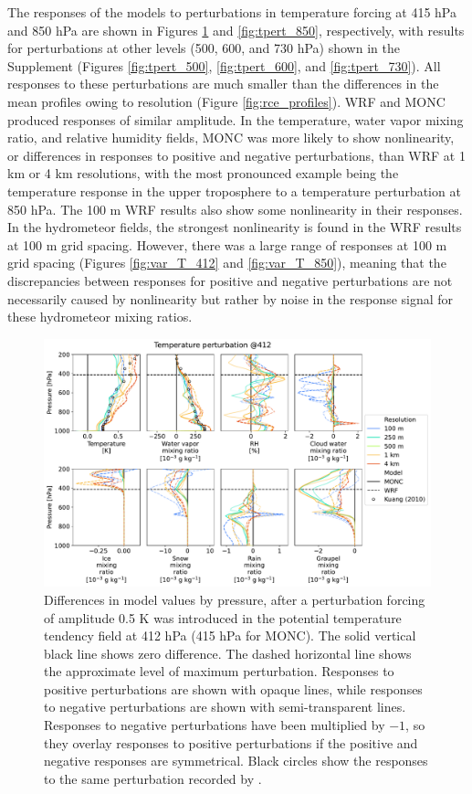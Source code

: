 \documentclass[draft]{agujournal2019}
\begin{document}
The responses of the models to perturbations in temperature forcing at 415 hPa and
850 hPa are shown in Figures \ref{fig:tpert_412} and \ref{fig:tpert_850},
respectively, with results for perturbations at other levels (500, 600, and 730
hPa) shown in the Supplement (Figures \ref{fig:tpert_500}, \ref{fig:tpert_600},
and \ref{fig:tpert_730}). All responses to these perturbations are much smaller
than the differences in the mean profiles owing to resolution (Figure
\ref{fig:rce_profiles}). WRF and MONC produced responses of similar amplitude.
In the temperature, water vapor mixing ratio, and relative humidity fields, MONC
was more likely to show nonlinearity, or differences in responses to positive
and negative perturbations, than WRF at 1 km or 4 km resolutions, with the
most pronounced example being the temperature response in the upper troposphere to a
temperature perturbation at 850 hPa. The 100 m WRF results also show some
nonlinearity in their responses. In the hydrometeor fields, the strongest
nonlinearity is found in the WRF results at 100 m grid spacing. However, there
was a large range of responses at 100 m grid spacing (Figures
\ref{fig:var_T_412} and \ref{fig:var_T_850}), meaning that the discrepancies
between responses for positive and negative perturbations are not necessarily
caused by nonlinearity but rather by noise in the response signal for these
hydrometeor mixing ratios.

\begin{figure}[pth]
    \noindent\includegraphics[width=\textwidth]{figures/pert_diffs_T_0.5_@412}
    \caption{Differences in model values by pressure, after a perturbation forcing of amplitude
    0.5 K was introduced in the potential temperature tendency field at 412 hPa
    (415 hPa for MONC). The solid vertical black line shows zero difference. The
    dashed horizontal line shows the approximate level of maximum perturbation.
    Responses to positive perturbations are shown with opaque lines, while
    responses to negative perturbations are shown with semi-transparent lines.
    Responses to negative perturbations have been multiplied by $-1$, so they
    overlay responses to positive perturbations if the positive and negative
    responses are symmetrical. Black circles show the responses to the same
    perturbation recorded by .}
    \label{fig:tpert_412}
\end{figure}
\end{document}
